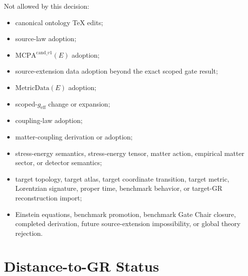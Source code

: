 \documentclass[11pt]{article}
\newcommand{\MCPA}{\mathrm{MCPA}^{\mathrm{cand}\_v1}}
\newcommand{\MetricData}{\mathrm{MetricData}}
\newcommand{\geff}{g_{\mathrm{eff}}}
\begin{document}
Not allowed by this decision:
\begin{itemize}[leftmargin=*]
  \item canonical ontology TeX edits;
  \item source-law adoption;
  \item \(\MCPA(E)\) adoption;
  \item source-extension data adoption beyond the exact scoped gate result;
  \item \(\MetricData(E)\) adoption;
  \item scoped-\(\geff\) change or expansion;
  \item coupling-law adoption;
  \item matter-coupling derivation or adoption;
  \item stress-energy semantics, stress-energy tensor, matter action,
  empirical matter sector, or detector semantics;
  \item target topology, target atlas, target coordinate transition, target
  metric, Lorentzian signature, proper time, benchmark behavior, or target-GR
  reconstruction import;
  \item Einstein equations, benchmark promotion, benchmark Gate Chair closure,
  completed derivation, future source-extension impossibility, or global
  theory rejection.
\end{itemize}

\section{Distance-to-GR Status}
\end{document}
